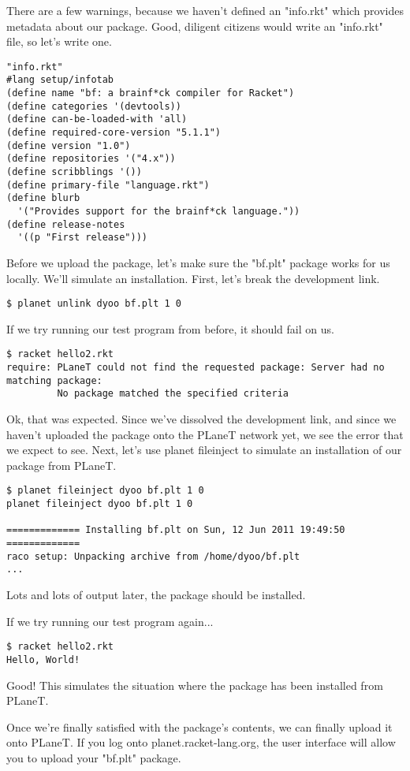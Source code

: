 \documentclass{article}
\begin{document}
There are a few warnings, because we haven't defined an "info.rkt" which provides metadata about our package. Good, diligent citizens would write an "info.rkt" file, so let's write one.
\begin{verbatim}
"info.rkt"
#lang setup/infotab
(define name "bf: a brainf*ck compiler for Racket")
(define categories '(devtools))
(define can-be-loaded-with 'all)
(define required-core-version "5.1.1")
(define version "1.0")
(define repositories '("4.x"))
(define scribblings '())
(define primary-file "language.rkt")
(define blurb
  '("Provides support for the brainf*ck language."))
(define release-notes
  '((p "First release")))
\end{verbatim}
Before we upload the package, let's make sure the "bf.plt" package works for us locally. We'll simulate an installation. First, let's break the development link.
\begin{verbatim}
$ planet unlink dyoo bf.plt 1 0
\end{verbatim}
If we try running our test program from before, it should fail on us.
\begin{verbatim}
$ racket hello2.rkt
require: PLaneT could not find the requested package: Server had no matching package:
         No package matched the specified criteria
\end{verbatim}
Ok, that was expected. Since we've dissolved the development link, and since we haven't uploaded the package onto the PLaneT network yet, we see the error that we expect to see.
Next, let's use planet fileinject to simulate an installation of our package from PLaneT.
\begin{verbatim}
$ planet fileinject dyoo bf.plt 1 0
planet fileinject dyoo bf.plt 1 0
 
============= Installing bf.plt on Sun, 12 Jun 2011 19:49:50 =============
raco setup: Unpacking archive from /home/dyoo/bf.plt
...
\end{verbatim}
Lots and lots of output later, the package should be installed.


If we try running our test program again...
\begin{verbatim}
$ racket hello2.rkt
Hello, World!
\end{verbatim}
Good! This simulates the situation where the package has been installed from PLaneT.

Once we're finally satisfied with the package's contents, we can finally upload it onto PLaneT. If you log onto planet.racket-lang.org, the user interface will allow you to upload your "bf.plt" package.
\end{document}
